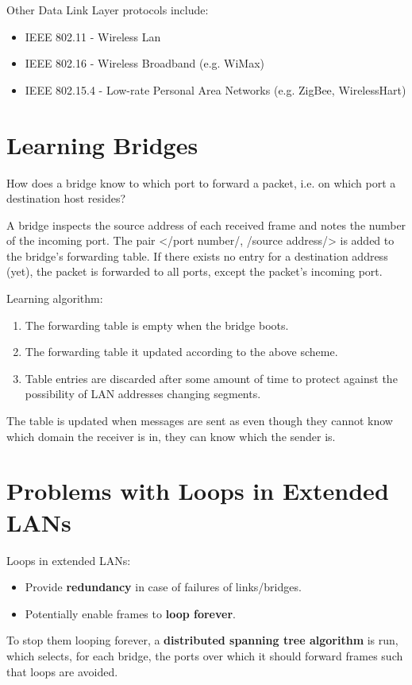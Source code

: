 \documentclass[11pt]{article}
\begin{document}
Other Data Link Layer protocols include:
\begin{itemize}
\item IEEE 802.11 - Wireless Lan
\item IEEE 802.16 - Wireless Broadband (e.g. WiMax)
\item IEEE 802.15.4 - Low-rate Personal Area Networks (e.g. ZigBee, WirelessHart)
\end{itemize}

\section{Learning Bridges}
\label{sec:org7a0c83d}
How does a bridge know to which port to forward a packet, i.e. on which port a destination host resides?

A bridge inspects the source address of each received frame and notes the number of the incoming port.
The pair </port number/, /source address/> is added to the bridge's forwarding table.
If there exists no entry for a destination address (yet), the packet is forwarded to all ports, except the packet's incoming port.

Learning algorithm:
\begin{enumerate}
\item The forwarding table is empty when the bridge boots.
\item The forwarding table it updated according to the above scheme.
\item Table entries are discarded after some amount of time to protect against the possibility of LAN addresses changing segments.
\end{enumerate}
The table is updated when messages are sent as even though they cannot know which domain the receiver is in, they can know which the sender is.


\section{Problems with Loops in Extended LANs}
\label{sec:org9a55d1c}
Loops in extended LANs:
\begin{itemize}
\item Provide \textbf{redundancy} in case of failures of links/bridges.
\item Potentially enable frames to \textbf{loop forever}.
\end{itemize}
To stop them looping forever, a \textbf{distributed spanning tree algorithm} is run, which selects, for each bridge, the ports over which it should forward frames such that loops are avoided.
\end{document}
